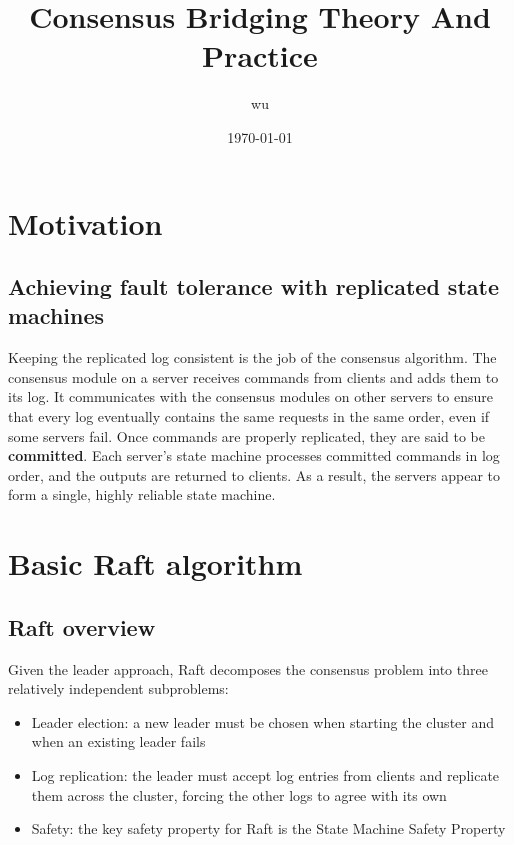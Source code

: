 \documentclass[11pt]{article}
\author{wu}
\date{\today}
\title{Consensus Bridging Theory And Practice}
\begin{document}
\maketitle
\section{Motivation}
\label{sec:org06d6775}

\subsection{Achieving fault tolerance with replicated state machines}
\label{sec:org75aa22d}
Keeping the replicated log consistent is the job of the consensus algorithm. The consensus module on a
server receives commands from clients and adds them to its log. It communicates with the consensus
modules on other servers to ensure that every log eventually contains the same requests in the same
order, even if some servers fail. Once commands are properly replicated, they are said to be
\textbf{committed}. Each server’s state machine processes committed commands in log order, and the outputs are
returned to clients. As a result, the servers appear to form a single, highly reliable state machine.
\section{Basic Raft algorithm}
\label{sec:org6002d9d}
\subsection{Raft overview}
\label{sec:org58030d5}
Given the leader approach, Raft decomposes the consensus problem into three relatively independent
subproblems:
\begin{itemize}
\item Leader election: a new leader must be chosen when starting the cluster and when an existing leader fails
\item Log replication: the leader must accept log entries from clients and replicate them across the cluster, forcing the other logs to agree with its own
\item Safety: the key safety property for Raft is the State Machine Safety Property
\end{itemize}
\end{document}
